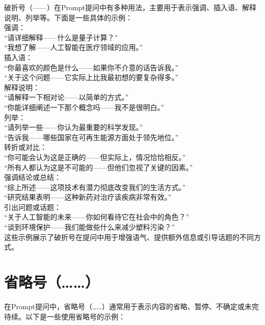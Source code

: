 \documentclass[12pt]{book}
\begin{document}
破折号（——）在Prompt提问中有多种用法，主要用于表示强调、插入语、解释说明、列举等。下面是一些具体的示例：\\

强调：\\
“请详细解释——什么是量子计算？”\\
“我想了解——人工智能在医疗领域的应用。”\\
插入语：\\
“你最喜欢的颜色是什么——如果你不介意的话告诉我。”\\
“关于这个问题——它实际上比我最初想的要复杂得多。”\\
解释说明：\\
“请解释一下相对论——以简单的方式。”\\
“你能详细阐述一下那个概念吗——我不是很明白。”\\
列举：\\
“请列举一些——你认为最重要的科学发现。”\\
“告诉我——哪些国家在可再生能源方面处于领先地位。”\\
转折或对比：\\
“你可能会认为这是正确的——但实际上，情况恰恰相反。”\\
“所有人都认为这是不可能的——但他们忽视了关键的因素。”\\
强调结论或总结：\\
“综上所述——这项技术有潜力彻底改变我们的生活方式。”\\
“研究结果表明——这种新药对治疗该疾病非常有效。”\\
引出问题或话题：\\
“关于人工智能的未来——你如何看待它在社会中的角色？”\\
“谈到环境保护——我们能做些什么来减少塑料污染？”\\
这些示例展示了破折号在提问中用于增强语气、提供额外信息或引导话题的不同方式。\\

\section{省略号（……）}
在Prompt提问中，省略号（……）通常用于表示内容的省略、暂停、不确定或未完待续。以下是一些使用省略号的示例：\\
\end{document}
